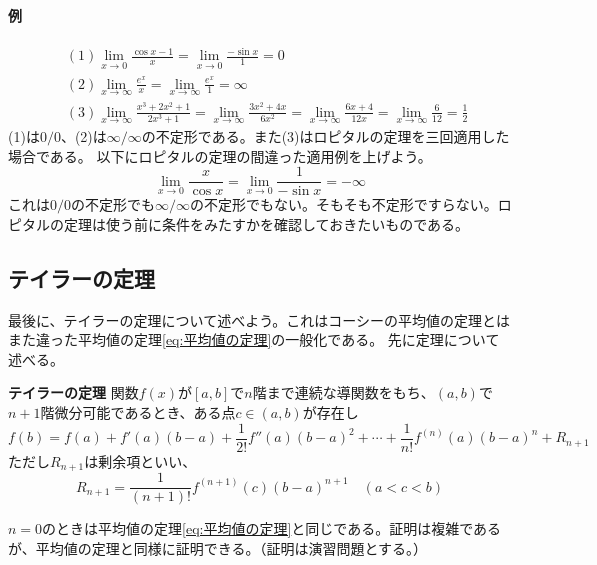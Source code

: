 \documentclass[a4j,dvipdfmx]{jsarticle}
\begin{document}
                    \paragraph{例}
                        \begin{align*}
                            &(1) \lim_{x\to 0}\frac{\cos x-1}{x}=\lim_{x\to 0}\frac{-\sin x}{1}=0\\
                            &(2) \lim_{x\to \infty}\frac{e^{x}}{x}=\lim_{x\to\infty}\frac{e^x}{1}=\infty\\\
                            &(3) \lim_{x\to \infty}\frac{x^3+2x^2+1}{2x^3+1}=\lim_{x\to \infty}\frac{3x^2+4x}{6x^2}=\lim_{x\to\infty}\frac{6x+4}{12x}=\lim_{x\to\infty}\frac{6}{12}=\frac{1}{2}
                        \end{align*}
                        (1)は$0/0$、(2)は$\infty/\infty$の不定形である。また(3)はロピタルの定理を三回適用した場合である。
                    以下にロピタルの定理の間違った適用例を上げよう。
                    \begin{equation*}
                        \lim_{x\to 0}\frac{x}{\cos x}=\lim_{x\to 0}\frac{1}{-\sin x}=-\infty
                    \end{equation*}    
                    これは$0/0$の不定形でも$\infty/\infty$の不定形でもない。そもそも不定形ですらない。ロピタルの定理は使う前に条件をみたすかを確認しておきたいものである。
                    
                \clearpage
                \subsection{テイラーの定理}
                    最後に、テイラーの定理について述べよう。これはコーシーの平均値の定理とはまた違った平均値の定理\ref{eq:平均値の定理}の一般化である。
                    先に定理について述べる。
                    \begin{itembox}{\textbf{テイラーの定理}}
                        関数$f(x)$が$[a,b]$で$n$階まで連続な導関数をもち、$(a,b)$で$n+1$階微分可能であるとき、ある点$c\in(a,b)$が存在し
                        \begin{equation}
                            f(b)=f(a)+f'(a)(b-a)+\frac{1}{2!}f''(a)(b-a)^2+\cdots+\frac{1}{n!}f^{(n)}(a)(b-a)^n+R_{n+1}\label{eq:テイラーの定理}
                        \end{equation}
                        ただし$R_{n+1}$は剰余項といい、
                        \begin{equation}
                            R_{n+1}=\frac{1}{(n+1)!}f^{(n+1)}(c)(b-a)^{n+1}\quad(a<c<b)
                        \end{equation}
                    \end{itembox}
                    $n=0$のときは平均値の定理\ref{eq:平均値の定理}と同じである。証明は複雑であるが、平均値の定理と同様に証明できる。（証明は演習問題とする。）
\end{document}

